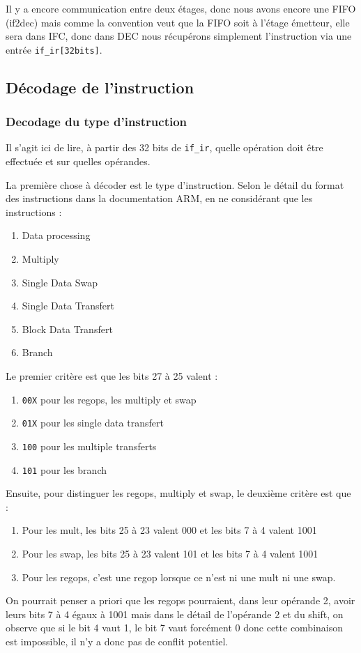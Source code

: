 \documentclass{article}
\begin{document}
Il y a encore communication entre deux étages, donc nous avons encore une FIFO (if2dec)
mais comme la convention veut que la FIFO soit à l'étage émetteur, elle sera dans IFC,
donc dans DEC nous récupérons simplement l'instruction via une entrée \texttt{if\_ir[32bits]}.

\subsection{Décodage de l'instruction}

\subsubsection{Decodage du type d'instruction}

Il s'agit ici de lire, à partir des 32 bits de \texttt{if\_ir}, quelle opération
doit être effectuée et sur quelles opérandes.

La première chose à décoder est le type d'instruction. Selon le détail du format des
instructions dans la documentation ARM, en ne considérant que les instructions :
\begin{enumerate}
  \item Data processing
  \item Multiply
  \item Single Data Swap
  \item Single Data Transfert
  \item Block Data Transfert
  \item Branch
\end{enumerate}

Le premier critère est que les bits 27 à 25 valent :
\begin{enumerate}
  \item \texttt{00X}    pour les regops, les multiply et swap
  \item \texttt{01X}    pour les single data transfert
  \item \texttt{100}    pour les multiple transferts
  \item \texttt{101}    pour les branch
\end{enumerate}

Ensuite, pour distinguer les regops, multiply et swap, le deuxième critère est que :
\begin{enumerate}
  \item Pour les mult, les bits 25 à 23 valent 000 et les bits 7 à 4 valent 1001
  \item Pour les swap, les bits 25 à 23 valent 101 et les bits 7 à 4 valent 1001
  \item Pour les regops, c'est une regop lorsque ce n'est ni une mult ni une swap.
\end{enumerate}
On pourrait penser a priori que les regops pourraient, dans leur opérande 2,
avoir leurs bits 7 à 4 égaux à 1001 mais dans le détail de l'opérande 2 et du shift,
on observe que si le bit 4 vaut 1, le bit 7 vaut forcément 0 donc cette combinaison est impossible,
il n'y a donc pas de conflit potentiel.
\end{document}
